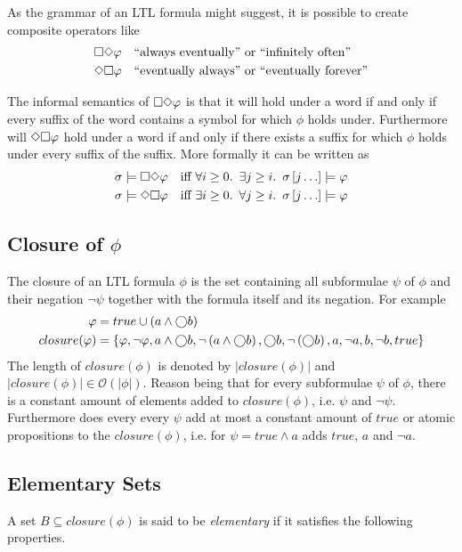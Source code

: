 As the grammar of an LTL formula might suggest, it is possible to create composite operators like
\begin{align*}
    &\square\Diamond\varphi \quad \text{``always eventually'' or ``infinitely often''}\\
    &\Diamond\square\varphi \quad \text{``eventually always'' or ``eventually forever''}
\end{align*}

The informal semantics of $\square\Diamond\varphi$ is that it will hold under a word if and only if every suffix of the word contains a symbol for which $\phi$ holds under. Furthermore will $\Diamond\square\varphi$ hold under a word if and only if there exists a suffix for which $\phi$ holds under every suffix of the suffix. More formally it can be written as
\begin{align*}
    \sigma &\models \square\Diamond \varphi &\text{iff }& \forall i \geq 0.\enskip \exists j \geq i.\enskip \sigma\left[j\ldots\right] \models \varphi \\
    \sigma &\models \Diamond\square \varphi &\text{iff }& \exists i \geq 0.\enskip \forall j \geq i.\enskip \sigma\left[j\ldots\right] \models \varphi
\end{align*}


\subsection{Closure of $\phi$}
The closure of an LTL formula $\phi$ is the set containing all subformulae $\psi$ of $\phi$ and their negation $\lnot \psi$ together with the formula itself and its negation. For example
\begin{align*}
    \varphi &= true \cup \left( a \land \bigcirc b \right) \\
    closure(\varphi) &= \left\{ \varphi, \lnot \varphi, a \land \bigcirc b, \lnot \left( a \land \bigcirc b \right), \bigcirc b, \lnot \left( \bigcirc b \right), a, \lnot a, b, \lnot b, true \right\}
\end{align*}
The length of $closure(\phi)$ is denoted by $|closure(\phi)|$ and $|closure(\phi)| \in \mathcal{O}\left(|\phi|\right)$. Reason being that for every subformulae $\psi$ of $\phi$, there is a constant amount of elements added to $closure(\phi)$, i.e. $\psi$ and $\lnot \psi$. Furthermore does every every $\psi$ add at most a constant amount of $true$ or atomic propositions to the $closure(\phi)$, i.e. for $\psi = true \land a$ adds $true$, $a$ and $\lnot a$.

\subsection{Elementary Sets}
\label{sec:elemesets}
A set $B \subseteq closure(\phi)$ is said to be \emph{elementary} if it satisfies the following properties.

